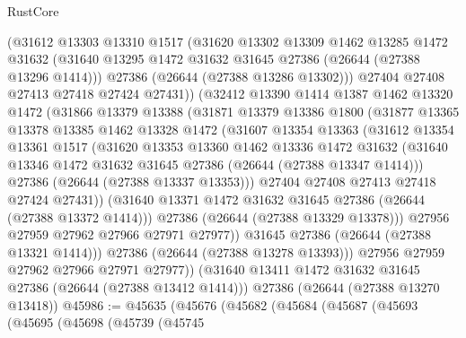 \begin{lexlean}{RustCore}
\begin{coremodule}
            (@31612
              @13303
              @13310
              @1517
              (@31620
                @13302
                @13309
                @1462
                @13285
                @1472
                @31632
                (@31640 @13295 @1472 @31632 @31645 @27386 (@26644 (@27388 @13296 @1414)))
                @27386
                (@26644 (@27388 @13286 @13302)))
              @27404
              @27408
              @27413
              @27418
              @27424
              @27431))
          (@32412
            @13390
            @1414
            @1387
            @1462
            @13320
            @1472
            (@31866
              @13379
              @13388
              (@31871
                @13379
                @13386
                @1800
                (@31877
                  @13365
                  @13378
                  @13385
                  @1462
                  @13328
                  @1472
                  (@31607
                    @13354
                    @13363
                    (@31612
                      @13354
                      @13361
                      @1517
                      (@31620
                        @13353
                        @13360
                        @1462
                        @13336
                        @1472
                        @31632
                        (@31640 @13346 @1472 @31632 @31645 @27386 (@26644 (@27388 @13347 @1414)))
                        @27386
                        (@26644 (@27388 @13337 @13353)))
                      @27404
                      @27408
                      @27413
                      @27418
                      @27424
                      @27431))
                  (@31640 @13371 @1472 @31632 @31645 @27386 (@26644 (@27388 @13372 @1414)))
                  @27386
                  (@26644 (@27388 @13329 @13378)))
                @27956
                @27959
                @27962
                @27966
                @27971
                @27977))
            @31645
            @27386
            (@26644 (@27388 @13321 @1414)))
          @27386
          (@26644 (@27388 @13278 @13393)))
        @27956
        @27959
        @27962
        @27966
        @27971
        @27977))
    (@31640 @13411 @1472 @31632 @31645 @27386 (@26644 (@27388 @13412 @1414)))
    @27386
    (@26644 (@27388 @13270 @13418))
@45986 := @45635
    (@45676
      (@45682
        (@45684
          (@45687
            (@45693
              (@45695
                (@45698
                  (@45739
                    (@45745

\end{coremodule}
\end{lexlean}
